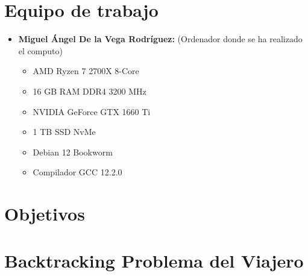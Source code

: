\documentclass[11pt,openany]{book}
\begin{document}
\chapter{Equipo de trabajo}

\begin{itemize}
      \item \textbf{Miguel Ángel De la Vega Rodríguez:} (Ordenador donde se ha realizado el computo)
            \begin{itemize}
                  \item AMD Ryzen 7 2700X 8-Core
                  \item 16 GB RAM DDR4 3200 MHz
                  \item NVIDIA GeForce GTX 1660 Ti
                  \item 1 TB SSD NvMe
                  \item Debian 12 Bookworm
                  \item Compilador GCC 12.2.0
            \end{itemize}
\end{itemize}

\chapter{Objetivos}

\chapter{Backtracking Problema del Viajero}
\end{document}
